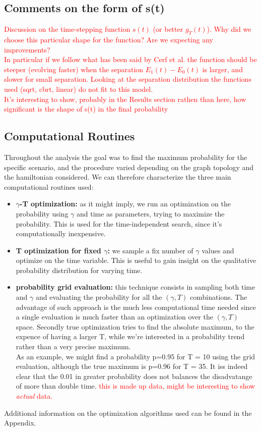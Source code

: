 \documentclass[aps,pra,reprint, onecolumn]{revtex4-2}
\newcommand{\red}[1]{\textcolor{red}{#1}}
\begin{document}
\subsection{Comments on the form of s(t)}
\red{Discussion on the time-stepping function $s(t)$ (or better  $g_T(t)$). Why did we choose this particular shape for the function? Are we expecting any improvements? \\ In particular if we follow what has been said by Cerf et al. the function should be steeper (evolving faster) when the separation $E_1(t)-E_0(t)$ is larger, and slower for small separation. Looking at the separation distribution the functions used (sqrt, cbrt, linear) do not fit to this model. \\ It's interesting to show, probably in the Results section rathen than here, how significant is the shape of s(t) in the final probability}


\subsection{Computational Routines}
Throughout the analysis the goal was to find the maximum probability for the specific scenario, and the procedure varied depending on the graph topology and the hamiltonian considered. We can therefore characterize the three main computational routines used:
\begin{itemize}
  \item \textbf{$\gamma$-T optimization:} as it might imply, we run an optimization on the probability using $\gamma$ and time as parameters, trying to maximize the probability. This is used for the time-independent search, since it's computationally inexpensive.
  \item \textbf{T optimization for fixed $\gamma$:} we sample a fix number of $\gamma$ values and optimize on the time variable. This is useful to gain insight on the qualitative probability distribution for varying time. 
  \item \textbf{probability grid evaluation:} this technique consists in sampling both time and $\gamma$ and evaluating the probability for all the $(\gamma, T)$ combinations. The advantage of such approach is the much less computational time needed since a single evaluation is much faster than an optimization over the $(\gamma, T)$ space. Secondly true optimization tries to find the absolute maximum, to the expence of having a larger T, while we're interested in a probability trend rather than a very precise maximum. \\ As an example, we might find a probability p=0.95 for T = 10 using the grid evaluation, although the true maximum is p=0.96 for T = 35. It iss indeed clear that the 0.01 in greater probability does not balances the disadvatange of more than double time. \red{this is made up data, might be interesting to show \textit{actual} data.}
\end{itemize}
Additional information on the optimization algorithms used can be found in the Appendix.
\end{document}
